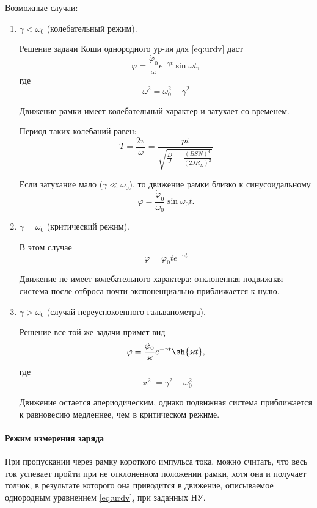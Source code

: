 \documentclass[a4paper, 12pt, twoside]{article}
\begin{document}
Возможные случаи:
\begin{enumerate}
	\item $\gamma < \omega_0$ (колебательный режим).
	
	Решение задачи Коши однородного ур-ия для \eqref{eq:urdv} даст
	\begin{equation}
	\varphi = \dfrac{\dot{\varphi}_0}{\omega}e^{-\gamma t}\sin{\omega t},
	\end{equation}
	где 
	\begin{equation}\label{eq:omega}
	\omega^2 = \omega_0^2 - \gamma^2
	\end{equation}
	
	Движение рамки имеет колебательный характер и затухает со временем.
	
	Период таких колебаний равен:
	\begin{equation}
	T = \dfrac{2\pi}{\omega} = \dfrac{pi}{\sqrt{\frac{D}{J} - \frac{(BSN)^4}{(2JR_\Sigma)^2}}}
	\end{equation}
	
	Если затухание мало ($\gamma \ll \omega_0$), то движение рамки близко к синусоидальному
	\begin{equation}
	\varphi = \dfrac{\dot{\varphi}_0}{\omega_0}\sin{\omega_0 t}.
	\end{equation}
	
	\item $\gamma = \omega_0$ (критический режим).
	
	В этом случае
	\begin{equation}
	\varphi = \dot{\varphi}_0te^{-\gamma t}
	\end{equation}
	
	Движение не имеет колебательного характера: отклоненная подвижная система после отброса почти экспоненциально приближается к нулю.
	
	\item  $\gamma > \omega_0$ (случай переуспокоенного гальванометра).
	
	Решение все той же задачи примет вид
	\begin{equation}\label{eq:dphi}
	\varphi = \dfrac{\dot{\varphi}_0}{\varkappa}e^{-\gamma t}\sh{\varkappa t},
	\end{equation}
	где $$\varkappa^2 = \gamma^2 - \omega_0^2$$
	
	Движение остается апериодическим, однако подвижная система приближается к равновесию медленнее, чем в критическом режиме.
\end{enumerate} 

\paragraph{Режим измерения заряда}
При пропускании через рамку короткого импульса тока, можно считать, что весь ток успевает пройти при не отклоненном положении рамки, хотя она и получает толчок, в результате которого она приводится в движение, описываемое однородным уравнением \eqref{eq:urdv}, при заданных НУ.
\end{document}
